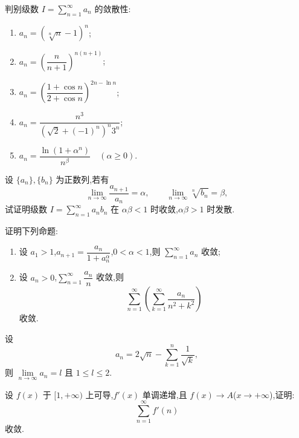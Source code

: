 \documentclass[../数学分析培优讲义.tex]{subfiles}
\begin{document}
\begin{example}
判别级数 $\displaystyle I=\sum\limits_{n=1}^{\infty}a_n$ 的敛散性:
\begin{enumerate}[label=(\arabic*)]
    \item $\displaystyle a_n=(\sqrt[n]{n}-1)^n$;
    \item $\displaystyle a_n=\left(\dfrac{n}{n+1}\right)^{n(n+1)}$;
    \item $\displaystyle a_n=\left(\dfrac{1+\cos n}{2+\cos n}\right)^{2n-\ln n}$;
    \item $\displaystyle a_n=\dfrac{n^3}{(\sqrt2+(-1)^n)^n3^n}$;
    \item $\displaystyle a_n=\dfrac{\ln(1+\alpha^n)}{n^\beta}\quad(\alpha\geq0)$.
\end{enumerate}
\end{example}
\exampleblank

\begin{example}
设 $\{a_n\},\{b_n\}$ 为正数列,若有
\[
    \lim\limits_{n\to\infty}\dfrac{a_{n+1}}{a_n}=\alpha,
    \qquad
    \lim\limits_{n\to\infty}\sqrt[n]{b_n}=\beta,
\]
试证明级数 $\displaystyle I=\sum\limits_{n=1}^{\infty}a_nb_n$ 在 $\alpha\beta<1$ 时收敛,$\alpha\beta>1$ 时发散.
\end{example}
\exampleblank


\newpage


\begin{example}
证明下列命题:
\begin{enumerate}[label=(\arabic*)]
    \item 设 $a_1>1$,$\displaystyle a_{n+1}=\dfrac{a_n}{1+a_n^\alpha}$,$0<\alpha<1$,则 $\displaystyle\sum\limits_{n=1}^{\infty}a_n$ 收敛;
    \item 设 $a_n>0$,$\displaystyle\sum\limits_{n=1}^{\infty}\dfrac{a_n}{n}$ 收敛,则
    \[
        \sum\limits_{n=1}^{\infty}\left(\sum\limits_{k=1}^{\infty}\dfrac{a_n}{n^2+k^2}\right)
    \]
    收敛.
\end{enumerate}
\end{example}
\exampleblank

\begin{example}
设
\[
    a_n=2\sqrt n-\sum\limits_{k=1}^n\dfrac{1}{\sqrt k},
\]
则 $\displaystyle\lim\limits_{n\to\infty}a_n=l$ 且 $1\leq l\leq2$.
\end{example}
\exampleblank

\begin{example}
设 $f(x)$ 于 $\lbrack 1,+\infty)$ 上可导,$f'(x)$ 单调递增,且 $f(x)\to A$($x\to+\infty$),证明:
\[
    \sum\limits_{n=1}^{\infty}f'(n)
\]
收敛.
\end{example}
\exampleblank
\end{document}
